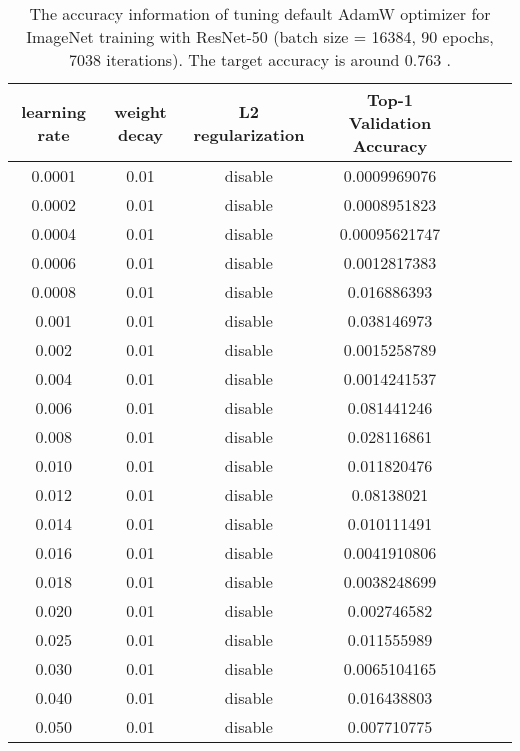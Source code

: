 \documentclass{article} \usepackage{iclr2020_conference,times}
\begin{document}
\begin{table}[ht]
\renewcommand{\arraystretch}{1.3}
\caption{The accuracy information of tuning default AdamW optimizer for ImageNet training with ResNet-50 (batch size = 16384, 90 epochs, 7038 iterations). The target accuracy is around 0.763 \citep{goyal2017accurate}.}
\centering
\begin{tabular}{|c|c|c|c|c|c|c|}
\hline
learning rate & weight decay & L2 regularization & Top-1 Validation Accuracy\\
\hline
\hline
0.0001 & 0.01 & disable & 0.0009969076 \\
\hline
0.0002 & 0.01 & disable & 0.0008951823 \\
\hline
0.0004 & 0.01 & disable & 0.00095621747 \\
\hline
0.0006 & 0.01 & disable & 0.0012817383 \\
\hline
0.0008 & 0.01 & disable & 0.016886393 \\
\hline
0.001 & 0.01 & disable & 0.038146973 \\
\hline
0.002 & 0.01 & disable & 0.0015258789 \\
\hline
0.004 & 0.01 & disable & 0.0014241537 \\
\hline
0.006 & 0.01 & disable & 0.081441246 \\
\hline
0.008 & 0.01 & disable & 0.028116861 \\
\hline
0.010 & 0.01 & disable & 0.011820476 \\
\hline
0.012 & 0.01 & disable & 0.08138021 \\
\hline
0.014 & 0.01 & disable & 0.010111491 \\
\hline
0.016 & 0.01 & disable & 0.0041910806 \\
\hline
0.018 & 0.01 & disable & 0.0038248699 \\
\hline
0.020 & 0.01 & disable & 0.002746582 \\
\hline
0.025 & 0.01 & disable & 0.011555989 \\
\hline
0.030 & 0.01 & disable & 0.0065104165 \\
\hline
0.040 & 0.01 & disable & 0.016438803 \\
\hline
0.050 & 0.01 & disable & 0.007710775 \\
\hline
\end{tabular}
\label{table:imagenet_adamw_default_4}
\end{table}
\end{document}
